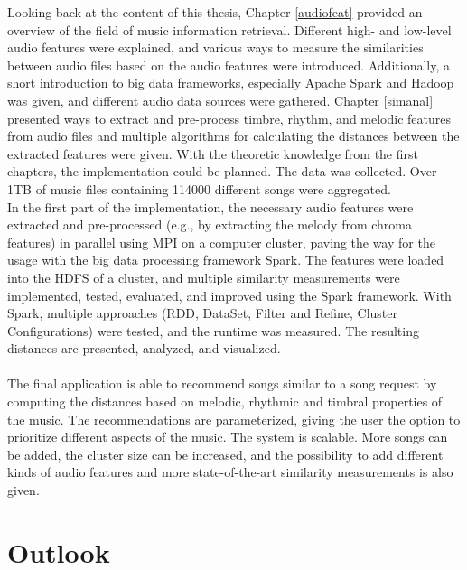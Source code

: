 Looking back at the content of this thesis, Chapter \ref{audiofeat} provided an overview of the field of music information retrieval. Different high- and low-level audio features were explained, and various ways to measure the similarities between audio files based on the audio features were introduced. Additionally, a short introduction to big data frameworks, especially Apache Spark and Hadoop was given, and different audio data sources were gathered. Chapter \ref{simanal} presented ways to extract and pre-process timbre, rhythm, and melodic features from audio files and multiple algorithms for calculating the distances between the extracted features were given. With the theoretic knowledge from the first chapters, the implementation could be planned. The data was collected. Over 1TB of music files containing 114000 different songs were aggregated.\\ 
In the first part of the implementation, the necessary audio features were extracted and pre-processed (e.g., by extracting the melody from chroma features) in parallel using MPI on a computer cluster, paving the way for the usage with the big data processing framework Spark.
The features were loaded into the HDFS of a cluster, and multiple similarity measurements were implemented, tested, evaluated, and improved using the Spark framework. With Spark, multiple approaches (RDD, DataSet, Filter and Refine, Cluster Configurations) were tested, and the runtime was measured. The resulting distances are presented, analyzed, and visualized.\\
\ \\
The final application is able to recommend songs similar to a song request by computing the distances based on melodic, rhythmic and timbral properties of the music. The recommendations are parameterized, giving the user the option to prioritize different aspects of the music. The system is scalable. More songs can be added, the cluster size can be increased, and the possibility to add different kinds of audio features and more state-of-the-art similarity measurements is also given. 

\section{Outlook}

